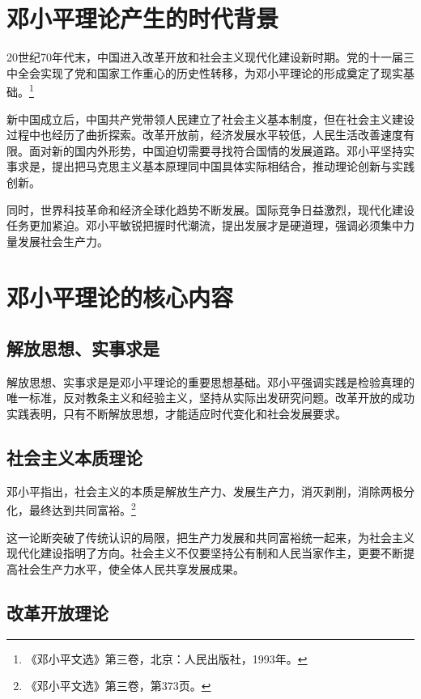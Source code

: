 \documentclass[12pt,a4paper]{article}
\begin{document}
\section{邓小平理论产生的时代背景}

20世纪70年代末，中国进入改革开放和社会主义现代化建设新时期。党的十一届三中全会实现了党和国家工作重心的历史性转移，为邓小平理论的形成奠定了现实基础。\footnote{《邓小平文选》第三卷，北京：人民出版社，1993年。}

新中国成立后，中国共产党带领人民建立了社会主义基本制度，但在社会主义建设过程中也经历了曲折探索。改革开放前，经济发展水平较低，人民生活改善速度有限。面对新的国内外形势，中国迫切需要寻找符合国情的发展道路。邓小平坚持实事求是，提出把马克思主义基本原理同中国具体实际相结合，推动理论创新与实践创新。

同时，世界科技革命和经济全球化趋势不断发展。国际竞争日益激烈，现代化建设任务更加紧迫。邓小平敏锐把握时代潮流，提出发展才是硬道理，强调必须集中力量发展社会生产力。

\section{邓小平理论的核心内容}

\subsection{解放思想、实事求是}

解放思想、实事求是是邓小平理论的重要思想基础。邓小平强调实践是检验真理的唯一标准，反对教条主义和经验主义，坚持从实际出发研究问题。改革开放的成功实践表明，只有不断解放思想，才能适应时代变化和社会发展要求。

\subsection{社会主义本质理论}

邓小平指出，社会主义的本质是解放生产力、发展生产力，消灭剥削，消除两极分化，最终达到共同富裕。\footnote{《邓小平文选》第三卷，第373页。}

这一论断突破了传统认识的局限，把生产力发展和共同富裕统一起来，为社会主义现代化建设指明了方向。社会主义不仅要坚持公有制和人民当家作主，更要不断提高社会生产力水平，使全体人民共享发展成果。

\subsection{改革开放理论}
\end{document}
